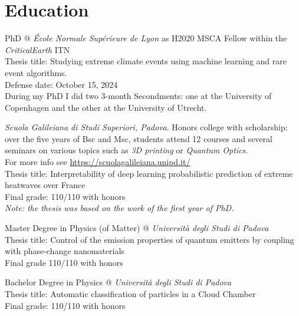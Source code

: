 \documentclass[11pt, a4 paper]{article}
\begin{document}
\section*{Education}
  \begin{description}[style=multiline,leftmargin=3cm,align=right]
    \item[2021-2024]
      PhD @ \emph{\'Ecole Normale Supérieure de Lyon} as H2020 MSCA Fellow within the \emph{CriticalEarth} ITN \\
      Thesis title: Studying extreme climate events using machine learning and rare event algorithms. \\
      Defense date: October 15, 2024 \\
      During my PhD I did two 3-month Secondments: one at the University of Copenhagen and the other at the University of Utrecht.
    \item[2016-2022]
      \emph{Scuola Galileiana di Studi Superiori, Padova}. Honors college with scholarship: over the five years of Bsc and Msc, students attend 12 courses and several seminars on various topics such as \emph{3D printing} or \emph{Quantum Optics}. \\ For more info see \url{https://scuolagalileiana.unipd.it/} \\
      Thesis title: Interpretability of deep learning probabilistic prediction of extreme heatwaves over France \\
      Final grade: 110/110 with honors \\
      \emph{Note: the thesis was based on the work of the first year of PhD.}
    \item[2019-2021]
      Master Degree in Physics (of Matter) @ \emph{Università degli Studi di Padova} \\
      Thesis title: Control of the emission properties of quantum emitters by coupling with phase-change nanomaterials \\
      Final grade 110/110 with honors
    \item[2016-2019]
      Bachelor Degree in Physics @ \emph{Università degli Studi di Padova} \\
      Thesis title: Automatic classification of particles in a Cloud Chamber \\
      Final grade: 110/110 with honors
  \end{description}
\end{document}
